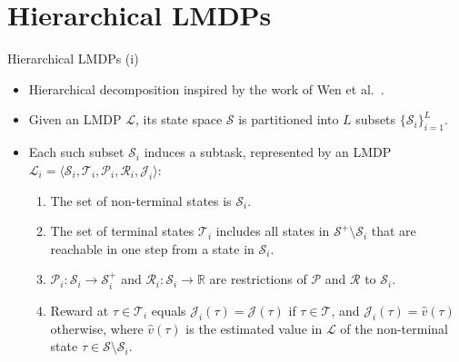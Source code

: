 \documentclass{beamer}
\theoremstyle{mystyle}
\newcommand{\cJ}{\mathcal{J}}
\newcommand{\cL}{\mathcal{L}}
\newcommand{\cP}{\mathcal{P}}
\newcommand{\cR}{\mathcal{R}}
\newcommand{\cS}{\mathcal{S}}
\newcommand{\cT}{\mathcal{T}}
\newcommand{\real}{\mathbb{R}}
\begin{document}
\section{Hierarchical LMDPs}
\begin{frame}{Hierarchical LMDPs (i)}

    \begin{itemize}
        \item Hierarchical decomposition inspired by the work of Wen et al.~\cite{conf/nips/Wen20}. 
        \item Given an LMDP $\cL$, its state space $\cS$ is partitioned into $L$ subsets $\{\cS_i\}_{i=1}^L$. 
        \item Each such subset $\cS_i$ induces a subtask, represented by an LMDP $\cL_i=\langle\cS_i,\cT_i,\cP_i,\cR_i,\cJ_i\rangle$:
        \begin{enumerate}
        \item The set of non-terminal states is $\cS_i$.
        \item The set of terminal states $\cT_i$ includes all states in $\cS^+\setminus\cS_i$ that are reachable in one step from a state in $\cS_i$.
        \item $\cP_i:\cS_i\rightarrow\cS_i^+$ and $\cR_i:\cS_i\rightarrow\real$ are restrictions of $\cP$ and $\cR$ to $\cS_i$.
        \item Reward at $\tau\in\cT_i$ equals $\cJ_i(\tau)=\cJ(\tau)$ if $\tau\in\cT$, and $\cJ_i(\tau)=\hat{v}(\tau)$ otherwise, where $\hat{v}(\tau)$ is the estimated value in $\cL$ of the non-terminal state $\tau\in\cS \setminus \cS_i$.
        \end{enumerate}
        
\end{itemize}

\end{frame}
\end{document}

